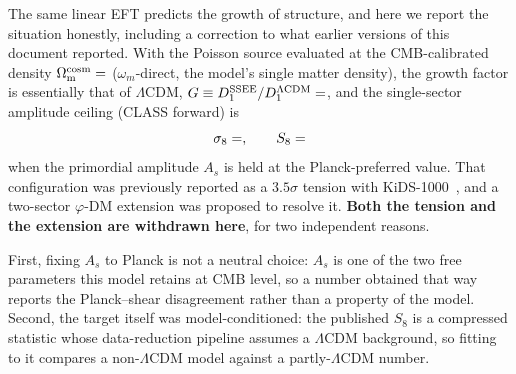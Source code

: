 \documentclass[a4paper,11pt]{article}
\newcommand{\Om}{\Omega_{\mathrm{m}}}
\begin{document}
The same linear EFT predicts the growth of structure, and here we report the
situation honestly, including a correction to what earlier versions of this
document reported. With the Poisson source evaluated at the CMB-calibrated
density $\Om^{\mathrm{cosm}}=\val{OMEGA_M_TOTAL_d6}$ ($\omega_m$-direct, the model's single matter density), the growth factor is
essentially that of $\Lambda$CDM,
$G\equiv D_1^{\rm SSEE}/D_1^{\Lambda\rm CDM}=\val{p5_G}$, and the
single-sector amplitude ceiling (CLASS forward) is
\begin{equation}
  \label{eq:s8}
  \sigma_8=\val{p3_sigma8_techo} , \qquad S_8=\val{p3_S8_techo}
\end{equation}
when the primordial amplitude $A_s$ is held at the Planck-preferred value.
That configuration was previously reported as a $3.5\sigma$ tension with
KiDS-1000~\citep{KiDS2021,DESY32022}, and a two-sector $\varphi$-DM extension
was proposed to resolve it. \textbf{Both the tension and the extension are
withdrawn here}, for two independent reasons.

First, fixing $A_s$ to Planck is not a neutral choice: $A_s$ is one of the two
free parameters this model retains at CMB level, so a number obtained that way
reports the Planck--shear disagreement rather than a property of the model.
Second, the target itself was model-conditioned: the published $S_8$
is a compressed statistic whose data-reduction pipeline assumes a $\Lambda$CDM
background, so fitting to it compares a non-$\Lambda$CDM model against a
partly-$\Lambda$CDM number.
\end{document}
